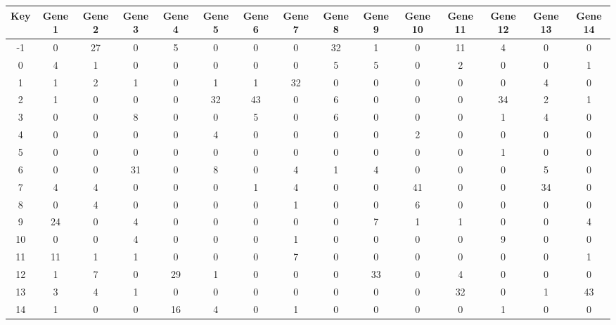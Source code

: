 \begin{tabular}{|c|c|c|c|c|c|c|c|c|c|c|c|c|c|c|}
\hline
Key & Gene 1 & Gene 2 & Gene 3 & Gene 4 & Gene 5 & Gene 6 & Gene 7 & Gene 8 & Gene 9 & Gene 10 & Gene 11 & Gene 12 & Gene 13 & Gene 14 \\
\hline
-1 & 0 & 27 & 0 & 5 & 0 & 0 & 0 & 32 & 1 & 0 & 11 & 4 & 0 & 0 \\
0 & 4 & 1 & 0 & 0 & 0 & 0 & 0 & 5 & 5 & 0 & 2 & 0 & 0 & 1 \\
1 & 1 & 2 & 1 & 0 & 1 & 1 & 32 & 0 & 0 & 0 & 0 & 0 & 4 & 0 \\
2 & 1 & 0 & 0 & 0 & 32 & 43 & 0 & 6 & 0 & 0 & 0 & 34 & 2 & 1 \\
3 & 0 & 0 & 8 & 0 & 0 & 5 & 0 & 6 & 0 & 0 & 0 & 1 & 4 & 0 \\
4 & 0 & 0 & 0 & 0 & 4 & 0 & 0 & 0 & 0 & 2 & 0 & 0 & 0 & 0 \\
5 & 0 & 0 & 0 & 0 & 0 & 0 & 0 & 0 & 0 & 0 & 0 & 1 & 0 & 0 \\
6 & 0 & 0 & 31 & 0 & 8 & 0 & 4 & 1 & 4 & 0 & 0 & 0 & 5 & 0 \\
7 & 4 & 4 & 0 & 0 & 0 & 1 & 4 & 0 & 0 & 41 & 0 & 0 & 34 & 0 \\
8 & 0 & 4 & 0 & 0 & 0 & 0 & 1 & 0 & 0 & 6 & 0 & 0 & 0 & 0 \\
9 & 24 & 0 & 4 & 0 & 0 & 0 & 0 & 0 & 7 & 1 & 1 & 0 & 0 & 4 \\
10 & 0 & 0 & 4 & 0 & 0 & 0 & 1 & 0 & 0 & 0 & 0 & 9 & 0 & 0 \\
11 & 11 & 1 & 1 & 0 & 0 & 0 & 7 & 0 & 0 & 0 & 0 & 0 & 0 & 1 \\
12 & 1 & 7 & 0 & 29 & 1 & 0 & 0 & 0 & 33 & 0 & 4 & 0 & 0 & 0 \\
13 & 3 & 4 & 1 & 0 & 0 & 0 & 0 & 0 & 0 & 0 & 32 & 0 & 1 & 43 \\
14 & 1 & 0 & 0 & 16 & 4 & 0 & 1 & 0 & 0 & 0 & 0 & 1 & 0 & 0 \\
\hline
\end{tabular}